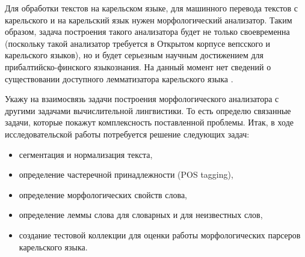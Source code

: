 Для обработки текстов на карельском языке, для машинного перевода текстов с карельского и на карельский язык нужен морфологический анализатор. Таким образом, задача построения такого анализатора будет не только своевременна (поскольку такой анализатор требуется в Открытом корпусе вепсского и карельского языков), но и будет серьезным научным достижением для прибалтийско-финского языкознания. На данный момент нет сведений о существовании доступного лемматизатора карельского языка .

Укажу на взаимосвязь задачи построения морфологического анализатора с другими задачами вычислительной лингвистики. То есть определю связанные задачи, которые покажут комплексность поставленной проблемы. Итак, в ходе исследовательской работы потребуется решение следующих задач:
\begin{itemize}
\item сегментация и нормализация текста,
\item определение частеречной принадлежности (POS tagging),
\item определение морфологических свойств слова,
\item определение леммы слова для словарных и для неизвестных слов,
\item создание тестовой коллекции для оценки работы морфологических парсеров карельского языка.
\end{itemize}
